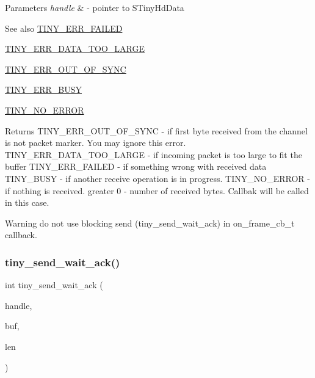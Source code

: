 \begin{DoxyParams}{Parameters}
{\em handle} & -\/ pointer to S\+Tiny\+Hd\+Data \\
\hline
\end{DoxyParams}
\begin{DoxySeeAlso}{See also}
\hyperlink{group__ERROR__FLAGS_ga84e6ca143550038e1a71cf36078d1926}{T\+I\+N\+Y\+\_\+\+E\+R\+R\+\_\+\+F\+A\+I\+L\+ED} 

\hyperlink{group__ERROR__FLAGS_ga7bbe7440d11ad304b0af68e011f4eab7}{T\+I\+N\+Y\+\_\+\+E\+R\+R\+\_\+\+D\+A\+T\+A\+\_\+\+T\+O\+O\+\_\+\+L\+A\+R\+GE} 

\hyperlink{group__ERROR__FLAGS_gae1949de45d9c478830dad9c9b996193a}{T\+I\+N\+Y\+\_\+\+E\+R\+R\+\_\+\+O\+U\+T\+\_\+\+O\+F\+\_\+\+S\+Y\+NC} 

\hyperlink{group__ERROR__FLAGS_ga9b3e170e1c6ce269f216ef4a1ac61995}{T\+I\+N\+Y\+\_\+\+E\+R\+R\+\_\+\+B\+U\+SY} 

\hyperlink{group__ERROR__FLAGS_ga69c869a686b67bf0b7b8115599515d61}{T\+I\+N\+Y\+\_\+\+N\+O\+\_\+\+E\+R\+R\+OR} 
\end{DoxySeeAlso}
\begin{DoxyReturn}{Returns}
T\+I\+N\+Y\+\_\+\+E\+R\+R\+\_\+\+O\+U\+T\+\_\+\+O\+F\+\_\+\+S\+Y\+NC -\/ if first byte received from the channel is not packet marker. You may ignore this error. T\+I\+N\+Y\+\_\+\+E\+R\+R\+\_\+\+D\+A\+T\+A\+\_\+\+T\+O\+O\+\_\+\+L\+A\+R\+GE -\/ if incoming packet is too large to fit the buffer T\+I\+N\+Y\+\_\+\+E\+R\+R\+\_\+\+F\+A\+I\+L\+ED -\/ if something wrong with received data T\+I\+N\+Y\+\_\+\+B\+U\+SY -\/ if another receive operation is in progress. T\+I\+N\+Y\+\_\+\+N\+O\+\_\+\+E\+R\+R\+OR -\/ if nothing is received. greater 0 -\/ number of received bytes. Callbak will be called in this case. 
\end{DoxyReturn}
\begin{DoxyWarning}{Warning}
do not use blocking send (tiny\+\_\+send\+\_\+wait\+\_\+ack) in on\+\_\+frame\+\_\+cb\+\_\+t callback. 
\end{DoxyWarning}
\mbox{\label{group__HALF__DUPLEX__API_ga5aad8dcb504b80bac923496f2686a6d6}} 
\subsubsection{\texorpdfstring{tiny\+\_\+send\+\_\+wait\+\_\+ack()}{tiny\_send\_wait\_ack()}}
{\footnotesize\ttfamily int tiny\+\_\+send\+\_\+wait\+\_\+ack (\begin{DoxyParamCaption}\item[{\hyperlink{tiny__hd_8h_af9f81ad129b754a780dfca5dcd7f7cf9}{S\+Tiny\+Hd\+Data} $\ast$}]{handle,  }\item[{void $\ast$}]{buf,  }\item[{uint16\+\_\+t}]{len }\end{DoxyParamCaption})}



